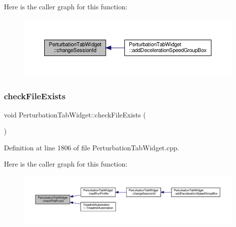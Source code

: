 Here is the caller graph for this function\+:
\nopagebreak
\begin{figure}[H]
\begin{center}
\leavevmode
\includegraphics[width=350pt]{class_perturbation_tab_widget_a9d551ffcaf3d0ebe54015f5536d261ab_icgraph}
\end{center}
\end{figure}
\mbox{\label{class_perturbation_tab_widget_a2bd4fa89c8315386ed15cd04f9b5ec84}} 
\subsubsection{\texorpdfstring{check\+File\+Exists}{checkFileExists}}
{\footnotesize\ttfamily void Perturbation\+Tab\+Widget\+::check\+File\+Exists (\begin{DoxyParamCaption}{ }\end{DoxyParamCaption})\hspace{0.3cm}{\ttfamily [slot]}}



Definition at line 1806 of file Perturbation\+Tab\+Widget.\+cpp.

Here is the caller graph for this function\+:
\nopagebreak
\begin{figure}[H]
\begin{center}
\leavevmode
\includegraphics[width=350pt]{class_perturbation_tab_widget_a2bd4fa89c8315386ed15cd04f9b5ec84_icgraph}
\end{center}
\end{figure}
\mbox{\label{class_perturbation_tab_widget_a9484f325434396eee32d49cacd8ed357}} 
